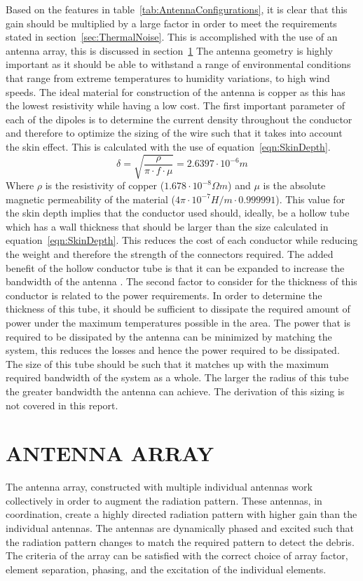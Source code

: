 \documentclass[11pt]{witseiepaper}
\begin{document}
\begin{bibunit}[witseie]
Based on the features in table~\ref{tab:AntennaConfigurations}, it is clear that this gain should be multiplied by a large factor in order to meet the requirements stated in section~\ref{sec:ThermalNoise}. This is accomplished with the use of an antenna array, this is discussed in section~\ref{sec:AntennaArray}
The antenna geometry is highly important as it should be able to withstand a range of environmental conditions that range from extreme temperatures to humidity variations, to high wind speeds.
The ideal material for construction of the antenna is copper as this has the lowest resistivity while having a low cost. The first important parameter of each of the dipoles is to determine the current density throughout the conductor and therefore to optimize the sizing of the wire such that it takes into account the skin effect. This is calculated with the use of equation~\ref{eqn:SkinDepth}.
\begin{equation} \label{eqn:SkinDepth}
\delta = \sqrt{\frac{\rho}{\pi \cdot f \cdot \mu}} = 2.6397 \cdot 10^{-6} m
\end{equation}
Where $\rho$ is the resistivity of copper ($1.678 \cdot 10^{-8} \Omega m$) and $\mu$ is the absolute magnetic permeability of the material ($4 \pi \cdot 10^{-7} H/m \cdot 0.999991$).
This value for the skin depth implies that the conductor used should, ideally, be a hollow tube which has a wall thickness that should be larger than the size calculated in equation~\ref{eqn:SkinDepth}. This reduces the cost of each conductor while reducing the weight and therefore the strength of the connectors required.
The added benefit of the hollow conductor tube is that it can be expanded to increase the bandwidth of the antenna \cite{BroadbandAntenna}. 
The second factor to consider for the thickness of this conductor is related to the power requirements. In order to determine the thickness of this tube, it should be sufficient to dissipate the required amount of power under the maximum temperatures possible in the area. The power that is required to be dissipated by the antenna can be minimized by matching the system, this reduces the losses and hence the power required to be dissipated.
The size of this tube should be such that it matches up with the maximum required bandwidth of the system as a whole. The larger the radius of this tube the greater bandwidth the antenna can achieve. The derivation of this sizing is not covered in this report.

\section{ANTENNA ARRAY} \label{sec:AntennaArray}
The antenna array, constructed with multiple individual antennas work collectively in order to augment the radiation pattern. These antennas, in coordination, create a highly directed radiation pattern with higher gain than the individual antennas. The antennas are dynamically phased and excited such that the radiation pattern changes to match the required pattern to detect the debris.
The criteria of the array can be satisfied with the correct choice of array factor, element separation, phasing, and the excitation of the individual elements.

\end{bibunit}
\end{document}
